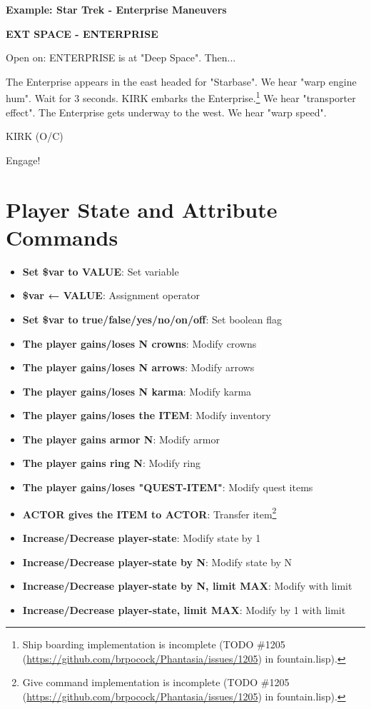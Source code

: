 \documentclass[11pt,letterpaper,oldstylefigures]{memoir}
\newcommand{\slugline}[1]{\nobreak\textbf{\MakeUppercase{#1}}\par\nobreak\vspace{1\baselineskip}}
\newcommand{\speaker}[1]{\nobreak\hspace*{0.333\textwidth}\MakeUppercase{#1}\par\nobreak\vspace{0.5\baselineskip}}
\newcommand{\dialogue}[1]{\nobreak\hspace*{0.25\textwidth}\begin{minipage}{0.5\textwidth}#1\end{minipage}\par\vspace{1\baselineskip}}
\newcommand{\stagedir}[1]{#1\par\vspace{1\baselineskip}}
\newenvironment{FountainExample}
  {\begingroup
  \ttfamily\small
   \setlength{\parindent}{0pt}
  \setlength{\parskip}{0.5em}
  \allowdisplaybreaks
  \setlength{\displaywidowpenalty}{0}
  \setlength{\widowpenalty}{0}
  \setlength{\clubpenalty}{0}
  \setlength{\interlinepenalty}{0}
}
  {\endgroup}
\newcommand{\fountain}[1]{\textbf{#1}}
\begin{document}
\textbf{Example: Star Trek - Enterprise Maneuvers}

\begin{FountainExample}
\slugline{EXT SPACE - ENTERPRISE}

\stagedir{Open on: ENTERPRISE is at "Deep Space". Then...}

\stagedir{The Enterprise appears in the east headed for "Starbase". We hear "warp engine hum". Wait for 3 seconds. KIRK embarks the Enterprise.\footnote{Ship boarding implementation is incomplete (TODO \#1205 (\href{https://github.com/brpocock/Phantasia/issues/1205}{https://github.com/brpocock/Phantasia/issues/1205}) in fountain.lisp).} We hear "transporter effect". The Enterprise gets underway to the west. We hear "warp speed".}

\speaker{KIRK (O/C)}
\dialogue{Engage!}
\end{FountainExample}

\section{Player State and Attribute Commands}
\begin{itemize}
\item \fountain{Set \$var to VALUE}: Set variable
\item \fountain{\$var ← VALUE}: Assignment operator
\item \fountain{Set \$var to true/false/yes/no/on/off}: Set boolean flag
\item \fountain{The player gains/loses N crowns}: Modify crowns
\item \fountain{The player gains/loses N arrows}: Modify arrows
\item \fountain{The player gains/loses N karma}: Modify karma
\item \fountain{The player gains/loses the ITEM}: Modify inventory
\item \fountain{The player gains armor N}: Modify armor
\item \fountain{The player gains ring N}: Modify ring
\item \fountain{The player gains/loses "QUEST-ITEM"}: Modify quest items
\item \fountain{ACTOR gives the ITEM to ACTOR}: Transfer item\footnote{Give command implementation is incomplete (TODO \#1205 (\href{https://github.com/brpocock/Phantasia/issues/1205}{https://github.com/brpocock/Phantasia/issues/1205}) in fountain.lisp).}
\item \fountain{Increase/Decrease player-state}: Modify state by 1
\item \fountain{Increase/Decrease player-state by N}: Modify state by N
\item \fountain{Increase/Decrease player-state by N, limit MAX}: Modify with limit
\item \fountain{Increase/Decrease player-state, limit MAX}: Modify by 1 with limit
\end{itemize}
\end{document}
